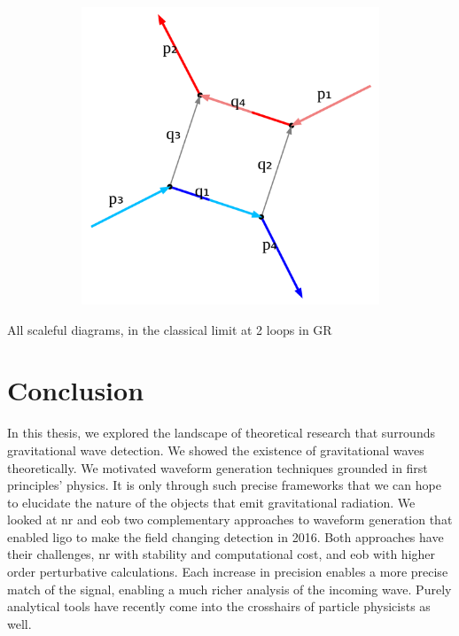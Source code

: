 \documentclass[
  11pt,
  a4paper,
  DIV=11,
  numbers=noendperiod,
  oneside]{scrreprt}
\DeclareRobustCommand{\[}{\begin{equation}}
\DeclareRobustCommand{\]}{\end{equation}}
\begin{document}
\hypertarget{fig-2lGRclassical}{}
{
\makeatletter
\def\LT@makecaption#1#2#3{%
  \noalign{\smash{\hbox{\kern\textwidth\rlap{\kern\marginparsep
  \parbox[t]{\marginparwidth}{%
    \footnotesize{%
      \vspace{(1.1\baselineskip)}
    #1{#2: }\ignorespaces #3}}}}}}%
    }
\makeatother

\begin{figure}[H]

{\centering \includegraphics[width=8in,height=3.5in]{./scattering_files/figure-latex/dot-figure-2.png}

}

\end{figure}

\label{fig-2lGRclassical}All scaleful diagrams, in the classical limit
at 2 loops in GR

}


\hypertarget{sec-conclusion}{%
\chapter{Conclusion}\label{sec-conclusion}}

In this thesis, we explored the landscape of theoretical research that
surrounds gravitational wave detection. We showed the existence of
gravitational waves theoretically. We motivated waveform generation
techniques grounded in first principles' physics. It is only through
such precise frameworks that we can hope to elucidate the nature of the
objects that emit gravitational radiation. We looked at \gls{nr} and
\gls{eob} two complementary approaches to waveform generation that
enabled \gls{ligo} to make the field changing detection in 2016. Both
approaches have their challenges, \gls{nr} with stability and
computational cost, and \gls{eob} with higher order perturbative
calculations. Each increase in precision enables a more precise match of
the signal, enabling a much richer analysis of the incoming wave. Purely
analytical tools have recently come into the crosshairs of particle
physicists as well.
\end{document}
